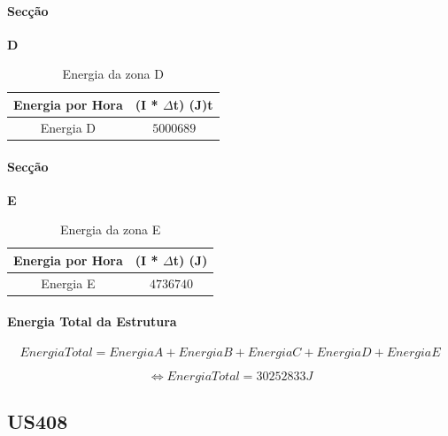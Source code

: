 \documentclass[12pt, a4paper]{article}
\begin{document}
\pagebreak
\paragraph{Secção}
\textbf{D}

\begin{table}[htpb]
	\begin{center}
		\begin{tabular}{c c}
			\toprule
			Energia por Hora 								 & 	(I * $\Delta$t) (J)t \\
			\midrule
			Energia D 						               	     & $5000689$	 \\
			\bottomrule
		\end{tabular}
	\end{center}
	\caption{Energia da zona D}\label{tab:4seccaoDpotT28}
\end{table}


\paragraph{Secção}
\textbf{E}

\begin{table}[htpb]
	\begin{center}
		\begin{tabular}{c c}
			\toprule
			Energia por Hora 								 & 	(I * $\Delta$t) (J) \\
			\midrule
			Energia E 						               	     & $4736740$	 \\
			\bottomrule
		\end{tabular}
	\end{center}
	\caption{Energia da zona E}\label{tab:4seccaoEpotT28}
\end{table}


\paragraph{Energia Total da Estrutura}

\begin{equation}
	Energia Total = Energia A + Energia B + Energia C + Energia D + Energia E
	\label{eq:3totalEnergia}
\end{equation}

\begin{equation}
	\Leftrightarrow Energia Total = 	30252833 J
	\label{eq:4totalEnergiaR}
\end{equation}

\subsection{US408}\label{sec:US408}
\end{document}
